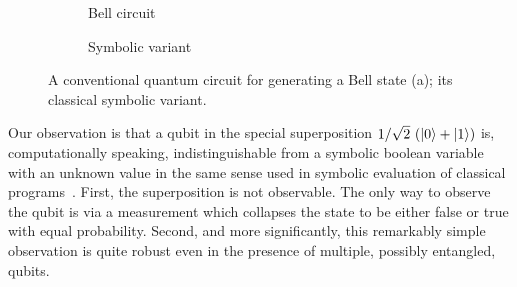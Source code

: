 \documentclass[sigplan,screen]{acmart}
\theoremstyle{definition}
\begin{document}
\begin{figure}[t]
  \centering
\begin{subfigure}[b]{.25\textwidth}
    \centering
\caption{\label{fig:bellqcore}Bell circuit}
\end{subfigure}
\qquad\qquad
\begin{subfigure}[b]{.25\textwidth}
    \centering
\caption{\label{fig:bellccore}Symbolic variant}
\end{subfigure}
\caption{\label{fig:bellall}A conventional quantum circuit for
  generating a Bell state (a); its classical symbolic variant.}
\end{figure}

Our observation is that a qubit in the special superposition
$1/\sqrt{2} ~(\ket{0} + \ket{1} )$ is, computationally speaking,
indistinguishable from a symbolic boolean variable with an unknown
value in the same sense used in symbolic evaluation of classical
programs~\cite{10.1145/390016.808445,10.1145/360248.360252,howden,10.1145/800191.805647,10.1145/3182657}.
First, the superposition is not observable. The only way to
observe the qubit is via a measurement which collapses the state to be
either false or true with equal probability. Second, and more
significantly, this remarkably simple observation is quite robust even
in the presence of multiple, possibly entangled, qubits.
\end{document}

